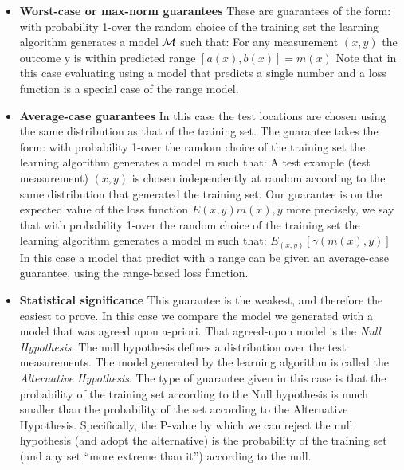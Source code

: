 \begin{itemize}
\item {\bf Worst-case or max-norm guarantees} These are guarantees of
  the form: with probability 1-over the random choice of the training
  set the learning algorithm generates a model $\cM$ such that: For
  any measurement $(x,y)$ the outcome y is within predicted range
  $[a(x),b(x)]=m(x)$ Note that in this case evaluating using a model
  that predicts a single number and a loss function is a special case
  of the range model.
\item{\bf Average-case guarantees} In this case the test locations are
  chosen using the same distribution as that of the training set. The
  guarantee takes the form: with probability 1-over the random choice
  of the training set the learning algorithm generates a model m such
  that: A test example (test measurement) $(x,y)$ is chosen
  independently at random according to the same distribution that
  generated the training set. Our guarantee is on the expected value
  of the loss function $E(x,y)m(x),y$ more precisely, we say that with
  probability 1-over the random choice of the training set the
  learning algorithm generates a model m such that: $E_{(x,y)}[\gamma(m(x),y)]$ In
  this case a model that predict with a range can be given an
  average-case guarantee, using the range-based loss function.

\item{\bf Statistical significance} This guarantee is the weakest, and
  therefore the easiest to prove. In this case we compare the model we
  generated with a model that was agreed upon a-priori. That
  agreed-upon model is the {\em Null Hypothesis}. The null hypothesis
  defines a distribution over the test measurements. The model
  generated by the learning algorithm is called the {\em Alternative
  Hypothesis}. The type of guarantee given in this case is that the
  probability of the training set according to the Null hypothesis is
  much smaller than the probability of the set according to the
  Alternative Hypothesis. Specifically, the P-value by which we can
  reject the null hypothesis (and adopt the alternative) is the
  probability of the training set (and any set ``more extreme than it'')
  according to the null.

\end{itemize}

